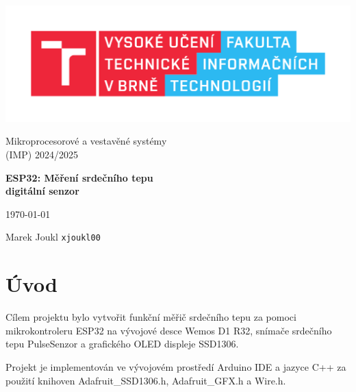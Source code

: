 \documentclass[11pt,a4paper]{article}
\begin{document}
\begin{titlepage}
    \begin{center}
        \includegraphics[scale=0.65]{fit.pdf} \\
                
        \vspace{2cm}
        
        \Large{
Mikroprocesorové a vestavěné systémy \\
(IMP) 2024/2025
		}
						                
		\vspace{2cm}
\vspace{2cm}



		\vspace{2cm}
		      
		\huge{
			\textbf{
				ESP32: Měření srdečního tepu \\
				digitální senzor } \\}
				
							                
			\vspace{2cm}

			\Large{}
			\today{}
			
			\vspace{2cm}
			
			Marek Joukl \verb|xjoukl00|
			\end{center}
			\end{titlepage}
\pagebreak{}
    
\tableofcontents
    
\pagebreak{}

\section{Úvod}

Cílem projektu bylo vytvořit funkční měřič srdečního tepu za pomoci mikrokontroleru ESP32 na vývojové desce Wemos D1 R32, snímače srdečního tepu PulseSenzor a grafického OLED displeje SSD1306.

Projekt je implementován ve vývojovém prostředí Arduino IDE a jazyce C++ za použití knihoven Adafruit\_SSD1306.h, Adafruit\_GFX.h a Wire.h.
\end{document}
